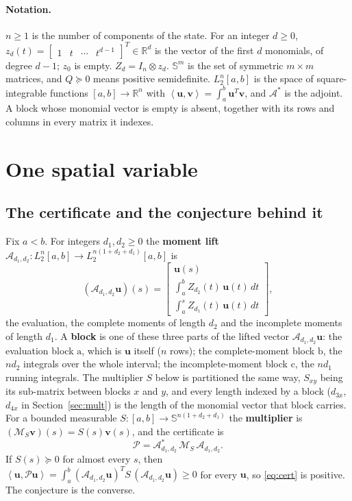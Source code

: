 \documentclass[12pt]{article}
\newcommand{\R}{\mathbb{R}}
\newcommand{\Sym}{\mathbb{S}}
\newcommand{\mcl}[1]{\mathcal{#1}}
\newcommand{\mbf}[1]{\mathbf{#1}}
\newcommand{\bmat}[1]{\begin{bmatrix} #1 \end{bmatrix}}
\newcommand{\ip}[2]{\left\langle #1,#2\right\rangle}
\newcommand{\ba}{\mathrm{a}}
\newcommand{\bb}{\mathrm{b}}
\newcommand{\bc}{\mathrm{c}}
\theoremstyle{plain}
\theoremstyle{definition}
\theoremstyle{remark}
\begin{document}
\paragraph{Notation.} $n\ge1$ is the number of components of the state. For an integer $d\ge0$, $z_d(t)=\bmat{1&t&\cdots&t^{d-1}}^T\in\R^{d}$ is the vector of the first $d$ monomials, of degree $d-1$; $z_0$ is empty. $Z_d=I_n\otimes z_d$. $\Sym^m$ is the set of symmetric $m\times m$ matrices, and $Q\succeq0$ means positive semidefinite. $L_2^n[a,b]$ is the space of square-integrable functions $[a,b]\to\R^n$ with $\ip{\mbf u}{\mbf v}=\int_a^b\mbf u^T\mbf v$, and $\mcl A^*$ is the adjoint. A block whose monomial vector is empty is absent, together with its rows and columns in every matrix it indexes.

\section{One spatial variable}\label{sec:1d}

\subsection{The certificate and the conjecture behind it}

Fix $a<b$. For integers $d_1,d_2\ge0$ the \textbf{moment lift} $\mcl A_{d_1,d_2}:L_2^n[a,b]\to L_2^{n(1+d_2+d_1)}[a,b]$ is
\begin{equation}\label{eq:lift}
(\mcl A_{d_1,d_2}\mbf u)(s)=\bmat{\mbf u(s)\\[3pt] \int_a^b Z_{d_2}(t)\,\mbf u(t)\,dt\\[3pt] \int_a^s Z_{d_1}(t)\,\mbf u(t)\,dt},
\end{equation}
the evaluation, the complete moments of length $d_2$ and the incomplete moments of length $d_1$. A \textbf{block} is one of these three parts of the lifted vector $\mcl A_{d_1,d_2}\mbf u$: the evaluation block $\ba$, which is $\mbf u$ itself ($n$ rows); the complete-moment block $\bb$, the $nd_2$ integrals over the whole interval; the incomplete-moment block $\bc$, the $nd_1$ running integrals. The multiplier $S$ below is partitioned the same way, $S_{xy}$ being its sub-matrix between blocks $x$ and $y$, and every length indexed by a block ($d_{3x}$, $d_{4x}$ in Section~\ref{sec:mult}) is the length of the monomial vector that block carries. For a bounded measurable $S:[a,b]\to\Sym^{n(1+d_2+d_1)}$ the \textbf{multiplier} is $(\mcl M_S\mbf v)(s)=S(s)\mbf v(s)$, and the certificate is
\begin{equation}\label{eq:cert}
\mcl P=\mcl A_{d_1,d_2}^*\,\mcl M_S\,\mcl A_{d_1,d_2}.
\end{equation}
If $S(s)\succeq0$ for almost every $s$, then $\ip{\mbf u}{\mcl P\mbf u}=\int_a^b(\mcl A_{d_1,d_2}\mbf u)^TS\,(\mcl A_{d_1,d_2}\mbf u)\ge0$ for every $\mbf u$, so \eqref{eq:cert} is positive. The conjecture is the converse.
\end{document}
